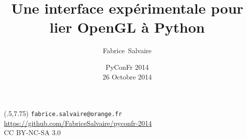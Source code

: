 





\title[]{Une interface expérimentale pour lier OpenGL à Python}
\author[F.~Salvaire]{Fabrice~Salvaire}
\date[26 oct 14]{PyConFr 2014 \\ {\tiny 26 Octobre 2014}}



\newcommand{\Cpp}{C\nolinebreak[4]\hspace{-.05em}\raisebox{.4ex}{\tiny\bf ++}}




%
%

\begin{frame} %
  \titlepage
  \begin{textblock}{12}(.5,7.75)
    \tiny%
    \texttt{fabrice.salvaire@orange.fr} \\
    \url{https://github.com/FabriceSalvaire/pyconfr-2014} \\
    CC BY-NC-SA 3.0
  \end{textblock}
\end{frame}

\logo{} %

%
%

